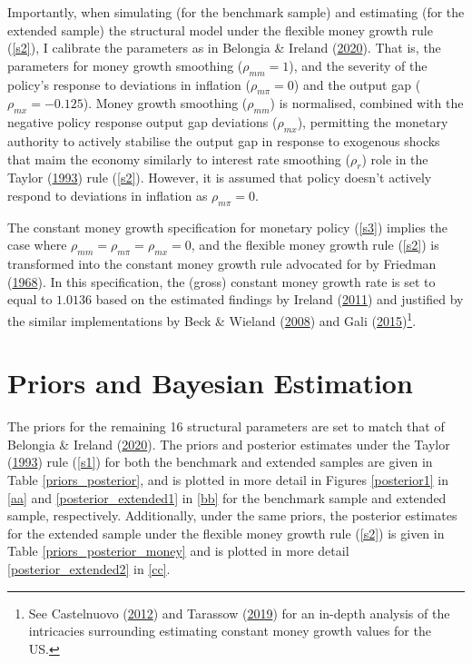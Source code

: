 \documentclass[11pt,preprint, authoryear]{elsarticle}
\numberwithin{equation}{section}
\numberwithin{figure}{section}
\numberwithin{table}{section}
\let\rmarkdownfootnote\footnote%
\def\footnote{\protect\rmarkdownfootnote}
\begin{document}
Importantly, when simulating (for the benchmark sample) and estimating
(for the extended sample) the structural model under the flexible money
growth rule (\ref{s2}), I calibrate the parameters as in Belongia \&
Ireland (\protect\hyperlink{ref-belongia2020}{2020}). That is, the
parameters for money growth smoothing (\(\rho_{mm}= 1\)), and the
severity of the policy's response to deviations in inflation
(\(\rho_{m \pi}=0\)) and the output gap (\(\rho_{mx}= -0.125\)). Money
growth smoothing (\(\rho_{mm}\)) is normalised, combined with the
negative policy response output gap deviations (\(\rho_{mx}\)),
permitting the monetary authority to actively stabilise the output gap
in response to exogenous shocks that maim the economy similarly to
interest rate smoothing (\(\rho_r\)) role in the Taylor
(\protect\hyperlink{ref-taylor1993}{1993}) rule (\ref{s2}). However, it
is assumed that policy doesn't actively respond to deviations in
inflation as \(\rho_{m \pi} = 0\).

The constant money growth specification for monetary policy (\ref{s3})
implies the case where \(\rho_{mm} = \rho_{m \pi}= \rho_{mx}=0\), and
the flexible money growth rule (\ref{s2}) is transformed into the
constant money growth rule advocated for by Friedman
(\protect\hyperlink{ref-friedman1968}{1968}). In this specification, the
(gross) constant money growth rate is set to equal to \(1.0136\) based
on the estimated findings by Ireland
(\protect\hyperlink{ref-ireland2011}{2011}) and justified by the similar
implementations by Beck \& Wieland
(\protect\hyperlink{ref-beck2008}{2008}) and Gali
(\protect\hyperlink{ref-gali2015}{2015})\footnote{See Castelnuovo
  (\protect\hyperlink{ref-castelnuovo2012}{2012}) and Tarassow
  (\protect\hyperlink{ref-tarassow2019}{2019}) for an in-depth analysis
  of the intricacies surrounding estimating constant money growth values
  for the US.}.

\hypertarget{priors-and-bayesian-estimation}{%
\section{Priors and Bayesian
Estimation}\label{priors-and-bayesian-estimation}}

The priors for the remaining 16 structural parameters are set to match
that of Belongia \& Ireland
(\protect\hyperlink{ref-belongia2020}{2020}). The priors and posterior
estimates under the Taylor (\protect\hyperlink{ref-taylor1993}{1993})
rule (\ref{s1}) for both the benchmark and extended samples are given in
Table \ref{priors_posterior}, and is plotted in more detail in Figures
\ref{posterior1} in \ref{aa} and \ref{posterior_extended1} in \ref{bb}
for the benchmark sample and extended sample, respectively.
Additionally, under the same priors, the posterior estimates for the
extended sample under the flexible money growth rule (\ref{s2}) is given
in Table \ref{priors_posterior_money} and is plotted in more detail
\ref{posterior_extended2} in \ref{cc}.
\end{document}
